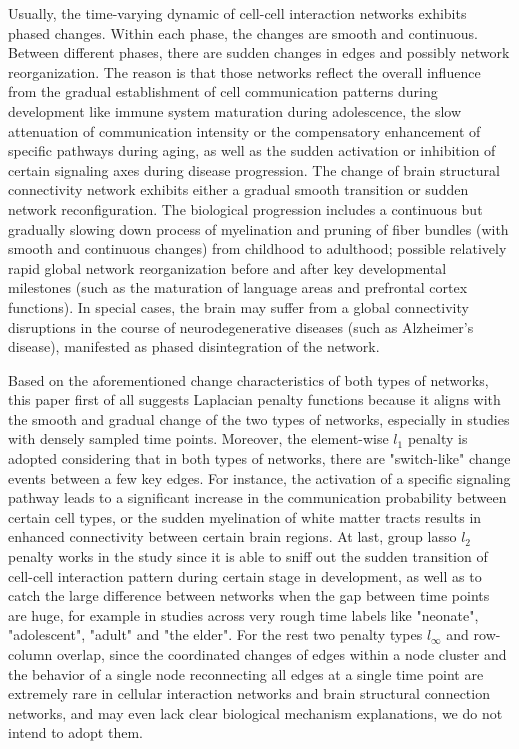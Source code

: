 Usually, the time-varying dynamic of cell-cell interaction networks exhibits phased changes. 
Within each phase, the changes are smooth and continuous. 
Between different phases, there are sudden changes in edges and possibly network reorganization.
The reason is that those networks reflect the overall influence from 
the gradual establishment of cell communication patterns during development like immune system maturation during adolescence, 
the slow attenuation of communication intensity or the compensatory enhancement of specific pathways during aging, 
as well as the sudden activation or inhibition of certain signaling axes during disease progression. 
The change of brain structural connectivity network exhibits either a gradual smooth transition or sudden network reconfiguration.
The biological progression includes a continuous but gradually slowing down process of myelination and pruning of fiber bundles (with smooth and continuous changes) from childhood to adulthood;
possible relatively rapid global network reorganization before and after key developmental milestones (such as the maturation of language areas and prefrontal cortex functions).  
In special cases, the brain may suffer from a global connectivity disruptions in the course of neurodegenerative diseases (such as Alzheimer's disease), manifested as phased disintegration of the network.

Based on the aforementioned change characteristics of both types of networks, 
this paper first of all suggests Laplacian penalty functions because it aligns with the smooth and gradual change of the two types of networks, 
especially in studies with densely sampled time points.
Moreover, the element-wise $l_1$ penalty is adopted considering that in both types of networks, 
there are "switch-like" change events between a few key edges. 
For instance, the activation of a specific signaling pathway leads to a significant increase in the communication probability between certain cell types, 
or the sudden myelination of white matter tracts results in enhanced connectivity between certain brain regions.
At last, group lasso $l_2$ penalty works in the study since it is able to sniff out the sudden transition of cell-cell interaction pattern during certain stage in development, 
as well as to catch the large difference between networks when the gap between time points are huge, 
for example in studies across very rough time labels like "neonate", "adolescent", "adult" and "the elder". 
For the rest two penalty types $l_{\infty}$ and row-column overlap, 
since the coordinated changes of edges within a node cluster 
and the behavior of a single node reconnecting all edges at a single time point are extremely rare in cellular interaction networks and brain structural connection networks, 
and may even lack clear biological mechanism explanations, 
we do not intend to adopt them.

